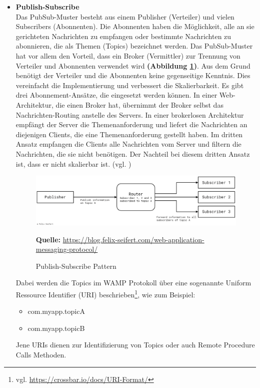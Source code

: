 \begin{itemize}
\item \textbf{Publish-Subscribe}\\
Das PubSub-Muster besteht aus einem Publisher (Verteiler) und vielen Subscribers (Abonnenten). Die Abonnenten haben die Möglichkeit, alle an sie gerichteten Nachrichten zu empfangen oder bestimmte Nachrichten zu abonnieren, die als Themen (Topics) bezeichnet werden. Das PubSub-Muster hat vor allem den Vorteil, dass ein Broker (Vermittler) zur Trennung von Verteiler und Abonnenten verwendet wird \textbf{(Abbildung \ref{fig:PubSub-Muster})}. Aus dem Grund benötigt der Verteiler und die Abonnenten keine gegenseitige Kenntnis. Dies vereinfacht die Implementierung und verbessert die Skalierbarkeit. Es gibt drei Abonnement-Ansätze, die eingesetzt werden können. In einer Web-Architektur, die einen Broker hat, übernimmt der Broker selbst das Nachrichten-Routing anstelle des Servers. In einer brokerlosen Architektur empfängt der Server die Themenanforderung und liefert die Nachrichten an diejenigen Clients, die eine Themenanforderung gestellt haben. Im dritten Ansatz empfangen die Clients alle Nachrichten vom Server und filtern die Nachrichten, die sie nicht benötigen. Der Nachteil bei diesem dritten Ansatz ist, dass er nicht skalierbar ist. (vgl. \cite{edu2018})\bigskip

\begin{figure}[H]
  \begin{center}
    \includegraphics[scale=0.4]{img/pub_sub}
	\caption{Publish-Subscribe Pattern}
	\footnotesize\sffamily\textbf{Quelle:} \url{https://blog.felix-seifert.com/web-application-messaging-protocol/} 
	\label{fig:PubSub-Muster}
  \end{center}   
\end{figure}

Dabei werden die Topics im WAMP Protokoll über eine sogenannte Uniform Ressource Identifier (URI) beschrieben\footnote{vgl. \url{https://crossbar.io/docs/URI-Format/}}, wie zum Beispiel:
\begin{itemize}
\item com.myapp.topicA
\item com.myapp.topicB
\end{itemize}
Jene URIs dienen zur Identifizierung von Topics oder auch Remote Procedure Calls Methoden.


\end{itemize}
